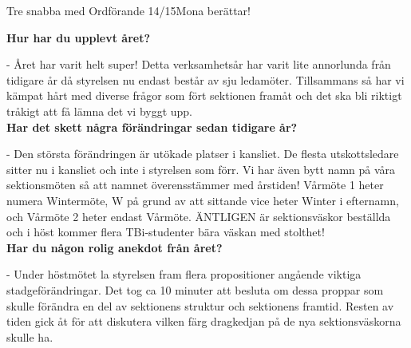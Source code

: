 \begin{news}{2}{Tre snabba med Ordförande 14/15}{Mona berättar!}{}{}


  \noindent \textbf{Hur har du upplevt året?}  
  
  - Året har varit helt super! Detta
  verksamhetsår har varit lite annorlunda från tidigare år då
  styrelsen nu endast består av sju ledamöter. Tillsammans så har vi
  kämpat hårt med diverse frågor som fört sektionen framåt och det ska
  bli riktigt tråkigt att få lämna det vi byggt upp.
  \\

  \noindent \textbf{Har det skett några förändringar sedan tidigare år?}  
  
  - Den
  största förändringen är utökade platser i kansliet. De flesta
  utskottsledare sitter nu i kansliet och inte i styrelsen som
  förr. Vi har även bytt namn på våra sektionsmöten så att namnet
  överensstämmer med årstiden!  Vårmöte 1 heter numera Wintermöte, W
  på grund av att sittande vice heter Winter i efternamn, och Vårmöte
  2 heter endast Vårmöte. ÄNTLIGEN är sektionsväskor beställda och i
  höst kommer flera TBi-studenter bära väskan med stolthet!
  \\

  \noindent \textbf{Har du någon rolig anekdot från året?}  
  
  - Under höstmötet la styrelsen fram flera propositioner angående viktiga
  stadgeförändringar. Det tog ca 10 minuter att besluta om dessa
  proppar som skulle förändra en del av sektionens struktur och
  sektionens framtid. Resten av tiden gick åt för att diskutera vilken
  färg dragkedjan på de nya sektionsväskorna skulle ha.






\end{news}
